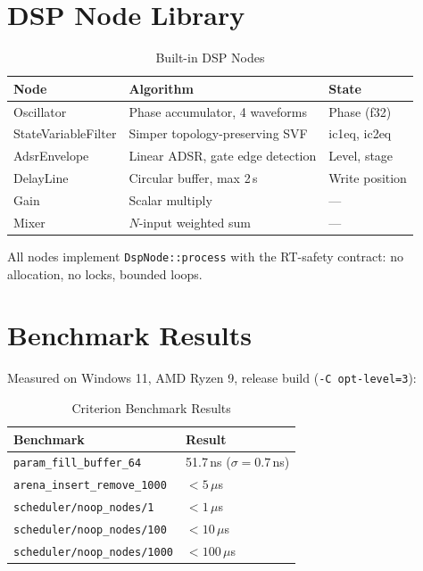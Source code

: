 \documentclass[conference]{IEEEtran}
\begin{document}
\section{DSP Node Library}

\begin{table}[h]
\caption{Built-in DSP Nodes}
\centering
\begin{tabular}{lll}
\hline
\textbf{Node} & \textbf{Algorithm} & \textbf{State} \\
\hline
Oscillator & Phase accumulator, 4 waveforms & Phase (f32) \\
StateVariableFilter & Simper topology-preserving SVF & ic1eq, ic2eq \\
AdsrEnvelope & Linear ADSR, gate edge detection & Level, stage \\
DelayLine & Circular buffer, max 2\,s & Write position \\
Gain & Scalar multiply & — \\
Mixer & $N$-input weighted sum & — \\
\hline
\end{tabular}
\end{table}

All nodes implement \texttt{DspNode::process} with the RT-safety contract: no
allocation, no locks, bounded loops.

\section{Benchmark Results}

Measured on Windows 11, AMD Ryzen 9, release build (\texttt{-C opt-level=3}):

\begin{table}[h]
\caption{Criterion Benchmark Results}
\centering
\begin{tabular}{ll}
\hline
\textbf{Benchmark} & \textbf{Result} \\
\hline
\texttt{param\_fill\_buffer\_64} & 51.7\,ns ($\sigma = 0.7$\,ns) \\
\texttt{arena\_insert\_remove\_1000} & $< 5\,\mu$s \\
\texttt{scheduler/noop\_nodes/1} & $< 1\,\mu$s \\
\texttt{scheduler/noop\_nodes/100} & $< 10\,\mu$s \\
\texttt{scheduler/noop\_nodes/1000} & $< 100\,\mu$s \\
\hline
\end{tabular}
\end{table}
\end{document}
